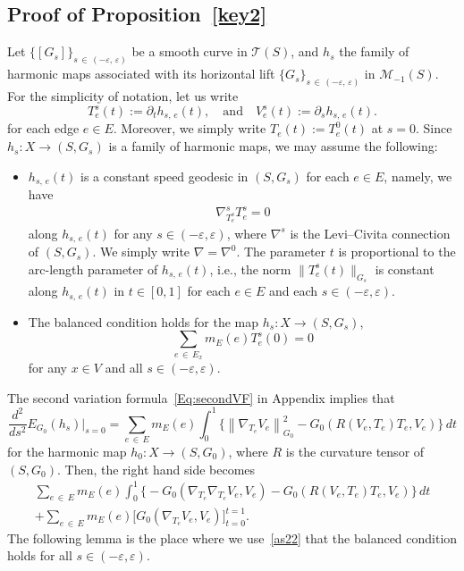 \documentclass[11pt]{article}
\theoremstyle{definition}
\newcommand{\Mc}{\mathcal{M}}
\numberwithin{equation}{section}
\newcommand{\e}{\varepsilon}
\renewcommand{\epsilon}{\varepsilon}
\newcommand{\p}{\psi}
\renewcommand{\Mc}{\mathcal{M}}
\newcommand{\Tc}{\mathcal{T}}
\renewcommand*\p{\partial}
\begin{document}
\subsection{Proof of Proposition~\ref{key2}} Let $\{[G_s]\}_{s\,\in\,(-\e,\,\e)}$ be a smooth curve in $\Tc(S)$, and $h_{s}$ the family of harmonic maps associated with its horizontal lift $\{G_s\}_{s\,\in\,(-\e,\,\e)}$ in $\Mc_{-1}(S)$. For the simplicity of notation, let us write
\[
T_e^{s}(t):=\p_t h_{s,\,e}(t), \quad \text{and} \quad V_e^{s}(t):=\p_s h_{s,\,e}(t).
\]
for each edge $e\in E$. Moreover, we simply write $T_e(t):=T_e^{0}(t)$ at $s=0$. Since $h_{s}: X\to (S, G_{s})$ is a family of harmonic maps, we may assume the following:
\begin{itemize}
\item $h_{s,\,e}(t)$ is a constant speed geodesic in $(S, G_{s})$ for each $e\in E$, namely, we have
\begin{align}\label{as21}
\nabla^{s}_{T_e^{s}}T_e^{s}=0
\end{align}
along $h_{s,\,e}(t)$ for any $s \in (-\epsilon, \epsilon)$, where $\nabla^{s}$ is the Levi--Civita connection of $(S, G_{s})$. We simply write $\nabla=\nabla^0$. The parameter $t$ is proportional to the arc-length parameter of $h_{s,\,e}(t)$, i.e., the norm $\|T_e^{s}(t)\|_{G_{s}}$ is constant along $h_{s,\,e}(t)$ in $t \in [0, 1]$ for each $e\in E$ and each $s \in (-\epsilon, \epsilon)$.
\item The balanced condition holds for the map $h_{s}: X\to (S, G_{s})$,
\begin{equation}\label{as22}
\sum_{e\,\in\,E_x}m_E(e) T_e^{s}(0)=0
\end{equation}
for any $x\in V$ and all $s\in (-\epsilon, \epsilon)$.
\end{itemize}



The second variation formula~\eqref{Eq:secondVF} in Appendix implies that
\begin{equation}\label{hf1}
\frac{d^2}{d s^2} E_{G_0}(h_{s})\Big|_{s=0}=\sum_{e\,\in\,E}m_E(e) \int_0^1 \Big\{\left\|\nabla_{T_e}V_e\right\|_{G_0}^2 -G_0\left(R\left(V_e, T_e\right)T_e, V_e\right)\Big\}\,dt
\end{equation}
for the harmonic map $h_{0}: X\to (S,G_0)$, where $R$ is the curvature tensor of $(S, G_0)$. Then, the right hand side becomes
\begin{multline}\label{hf2}
\sum_{e\,\in\,E}m_E(e)\int_0^1\Big\{-G_0\left(\nabla_{T_e}\nabla_{T_e}V_e, V_e\right)-G_0\left(R\left(V_e, T_e\right)T_e, V_e\right)\Big\}\,dt\\
+\sum_{e\,\in\,E}m_E(e)\big[G_0\left(\nabla_{T_e}V_e, V_e\right)\big]_{t=0}^{t=1}.
\end{multline}
The following lemma is the place where we use~\eqref{as22} that the balanced condition holds for all $s \in (-\e, \e)$.
\end{document}

